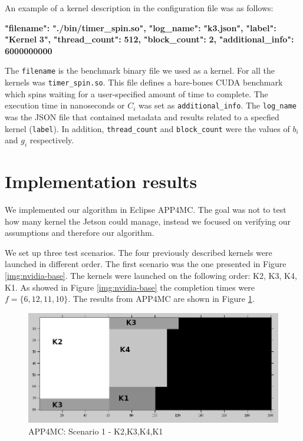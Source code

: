 \documentclass[
  12pt,
  a4paperpaper,
]{report}
\newenvironment{Shaded}{}{}
\newcommand{\ErrorTok}[1]{\textcolor[rgb]{1.00,0.00,0.00}{\textbf{#1}}}
\begin{document}
An example of a kernel description in the configuration file was as
follows:

\begin{Shaded}
\begin{Highlighting}[]
      \ErrorTok{"filename":} \ErrorTok{"./bin/timer\_spin.so",}
      \ErrorTok{"log\_name":} \ErrorTok{"k3.json",}
      \ErrorTok{"label":} \ErrorTok{"Kernel} \ErrorTok{3",}
      \ErrorTok{"thread\_count":} \ErrorTok{512,}
      \ErrorTok{"block\_count":} \ErrorTok{2,}
      \ErrorTok{"additional\_info":} \ErrorTok{6000000000}
\end{Highlighting}
\end{Shaded}

The \texttt{filename} is the benchmark binary file we used as a kernel.
For all the kernels was \texttt{timer\_spin.so}. This file defines a
bare-bones CUDA benchmark which spins waiting for a user-specified
amount of time to complete. The execution time in nanoseconds or \(C_i\)
was set as \texttt{additional\_info}. The \texttt{log\_name} was the
JSON file that contained metadata and results related to a specfied
kernel (\texttt{label}). In addition, \texttt{thread\_count} and
\texttt{block\_count} were the values of \(b_i\) and \(g_i\)
respectively.

\hypertarget{implementation-results}{%
\section{Implementation results}\label{implementation-results}}

We implemented our algorithm in Eclipse APP4MC. The goal was not to test
how many kernel the Jetson could manage, instead we focused on verifying
our assumptions and therefore our algorithm.

We set up three test scenarios. The four previously described kernels
were launched in different order. The first scenario was the one
presented in Figure \ref{img:nvidia-base}. The kernels were launched on
the following order: K2, K3, K4, K1. As showed in Figure
\ref{img:nvidia-base} the completion times were \(f = \{6, 12,11,10\}\).
The results from APP4MC are shown in Figure \ref{img:octave-base}.

\begin{figure}
\centering
\includegraphics[width=1\textwidth,height=\textheight]{source/figures/octave/base.png}
\caption{APP4MC: Scenario 1 - K2,K3,K4,K1 \label{img:octave-base}}
\end{figure}
\end{document}
